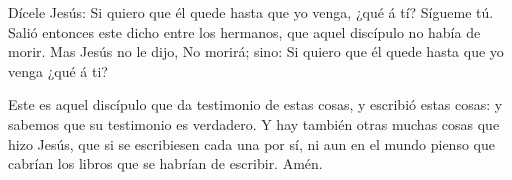  Dícele Jesús: Si quiero que él quede hasta que yo venga,
¿qué á tí? Sígueme tú.  Salió entonces este dicho entre los
hermanos, que aquel discípulo no había de morir. Mas Jesús no le dijo,
No morirá; sino: Si quiero que él quede hasta que yo venga ¿qué á ti?

 Este es aquel discípulo que da testimonio de estas cosas,
y escribió estas cosas: y sabemos que su testimonio es verdadero.
 Y hay también otras muchas cosas que hizo Jesús, que si se
escribiesen cada una por sí, ni aun en el mundo pienso que cabrían los
libros que se habrían de escribir. Amén.
